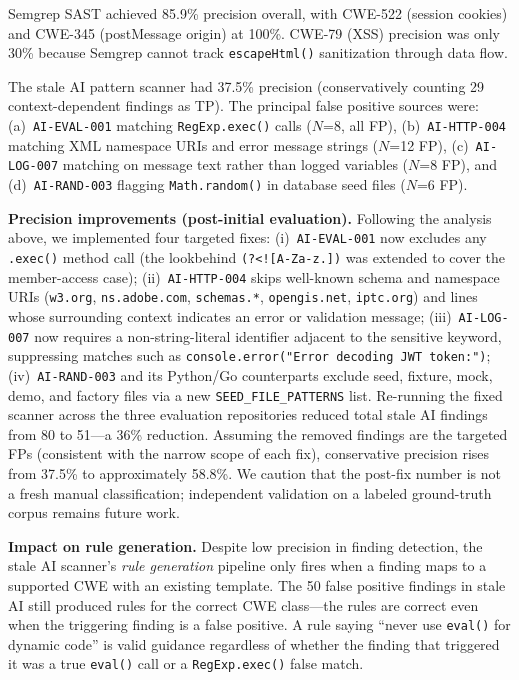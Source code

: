 \documentclass[conference,10pt]{IEEEtran}
\begin{document}
Semgrep SAST achieved 85.9\% precision overall, with CWE-522 (session cookies) and CWE-345 (postMessage origin) at 100\%. CWE-79 (XSS) precision was only 30\% because Semgrep cannot track \texttt{escapeHtml()} sanitization through data flow.

The stale AI pattern scanner had 37.5\% precision (conservatively counting 29 context-dependent findings as TP). The principal false positive sources were: (a)~\texttt{AI-EVAL-001} matching \texttt{RegExp.exec()} calls ($N$=8, all FP), (b)~\texttt{AI-HTTP-004} matching XML namespace URIs and error message strings ($N$=12 FP), (c)~\texttt{AI-LOG-007} matching on message text rather than logged variables ($N$=8 FP), and (d)~\texttt{AI-RAND-003} flagging \texttt{Math.random()} in database seed files ($N$=6 FP).

\textbf{Precision improvements (post-initial evaluation).} Following the analysis above, we implemented four targeted fixes: (i)~\texttt{AI-EVAL-001} now excludes any \texttt{.exec()} method call (the lookbehind \texttt{(?<![A-Za-z.])} was extended to cover the member-access case); (ii)~\texttt{AI-HTTP-004} skips well-known schema and namespace URIs (\texttt{w3.org}, \texttt{ns.adobe.com}, \texttt{schemas.*}, \texttt{opengis.net}, \texttt{iptc.org}) and lines whose surrounding context indicates an error or validation message; (iii)~\texttt{AI-LOG-007} now requires a non-string-literal identifier adjacent to the sensitive keyword, suppressing matches such as \texttt{console.error("Error decoding JWT token:")}; (iv)~\texttt{AI-RAND-003} and its Python/Go counterparts exclude seed, fixture, mock, demo, and factory files via a new \texttt{SEED\_FILE\_PATTERNS} list. Re-running the fixed scanner across the three evaluation repositories reduced total stale AI findings from 80 to 51---a 36\% reduction. Assuming the removed findings are the targeted FPs (consistent with the narrow scope of each fix), conservative precision rises from 37.5\% to approximately 58.8\%. We caution that the post-fix number is not a fresh manual classification; independent validation on a labeled ground-truth corpus remains future work.

\textbf{Impact on rule generation.} Despite low precision in finding detection, the stale AI scanner's \textit{rule generation} pipeline only fires when a finding maps to a supported CWE with an existing template. The 50 false positive findings in stale AI still produced rules for the correct CWE class---the rules are correct even when the triggering finding is a false positive. A rule saying ``never use \texttt{eval()} for dynamic code'' is valid guidance regardless of whether the finding that triggered it was a true \texttt{eval()} call or a \texttt{RegExp.exec()} false match.
\end{document}

